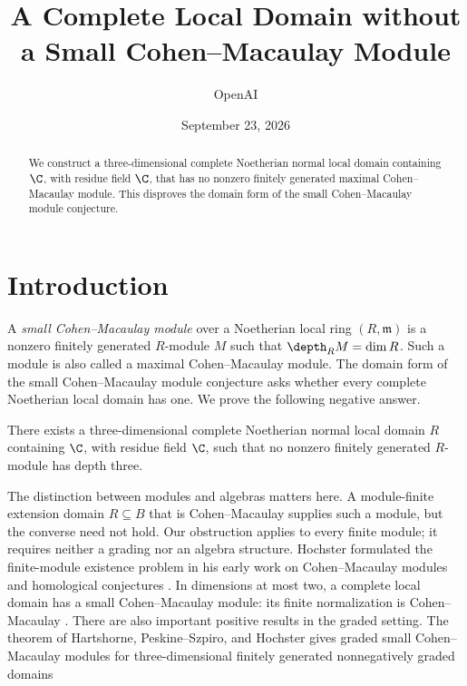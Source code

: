 \DeclareMathOperator{\Frac}{Frac}
\DeclareMathOperator{\Tot}{Tot}
\title{A Complete Local Domain without\\a Small Cohen--Macaulay Module}
\author{OpenAI}
\date{September 23, 2026}

\maketitle
\begin{abstract}
We construct a three-dimensional complete Noetherian normal local domain
containing $\C$, with residue field $\C$, that has no nonzero finitely generated
maximal Cohen--Macaulay module. This disproves the domain form of the small
Cohen--Macaulay module conjecture.
\end{abstract}
\tableofcontents
\clearpage

\section{Introduction}
A \emph{small Cohen--Macaulay module} over a Noetherian local ring $(R,\mathfrak m)$
is a nonzero finitely generated $R$-module $M$ such that
$\depth_R M=\dim R$. Such a module is also called a maximal Cohen--Macaulay
module. The domain form of the small Cohen--Macaulay module conjecture asks
whether every complete Noetherian local domain has one.
We prove the following negative answer.

\begin{theorem}\label{thm:main}
There exists a three-dimensional complete Noetherian normal local domain
$R$ containing $\C$, with residue field $\C$, such that no nonzero finitely
generated $R$-module has depth three.
\end{theorem}

The distinction between modules and algebras matters here. A module-finite extension domain $R\subseteq B$ that is
Cohen--Macaulay supplies such a module, but the converse need not hold. Our obstruction applies to every finite module;
it requires neither a grading nor an algebra structure.
Hochster formulated the finite-module existence problem in his early
work on Cohen--Macaulay modules and homological conjectures
\cite{Hochster1973,Hochster1975}. In dimensions at most two, a complete
local domain has a small Cohen--Macaulay module: its finite normalization
is Cohen--Macaulay \cite[Section~2]{Hochster2017}. There are also important
positive results in the graded setting. The theorem of Hartshorne,
Peskine--Szpiro, and Hochster gives graded small Cohen--Macaulay modules
for three-dimensional finitely generated nonnegatively graded domains
